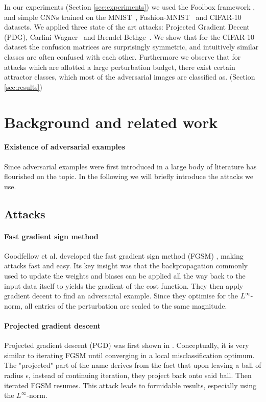\documentclass{article}
\begin{document}
In our experiments (Section \ref{sec:experiments}) we used the Foolbox framework \cite{rauber2017foolbox}, and simple CNNs trained on the MNIST~\cite{deng2012mnist}, Fashion-MNIST~\cite{deng2012mnist} and CIFAR-10~\cite{krizhevsky2009learning} datasets. We applied three state of the art attacks: Projected Gradient Decent (PDG)\cite{madry2017towards}, Carlini-Wagner~\cite{carlini2017towards} and Brendel-Bethge~\cite{brendel2019accurate}.
We show that for the CIFAR-10 dataset the confusion matrices are surprisingly symmetric, and intuitively similar classes are often confused with each other. Furthermore we observe that for attacks which are allotted a large perturbation budget, there exist certain attractor classes, which most of the adversarial images are classified as. (Section \ref{sec:results})

\section{Background and related work}

\paragraph{Existence of adversarial examples}
Since adversarial examples were first introduced in \cite{Szegedy13} a large body of literature has flourished on the topic. In the following we will briefly introduce the attacks we use.

\subsection{Attacks}\label{sec:Attacks}

\paragraph{Fast gradient sign method}
Goodfellow et al. developed the fast gradient sign method (FGSM) \cite{goodfellow2014explaining}, making attacks fast and easy. Its key insight was that the backpropagation commonly used to update the weights and biases can be applied all the way back to the input data itself to yields the gradient of the cost function. They then apply gradient decent to find an adversarial example. Since they optimise for the $L^\infty$-norm, all entries of the perturbation are scaled to the same magnitude.

\paragraph{Projected gradient descent}
Projected gradient descent (PGD) was first shown in \cite{madry2017towards}. Conceptually, it is very similar to iterating FGSM until converging in a local misclassification optimum. The "projected" part of the name derives from the fact that upon leaving a ball of radius $\epsilon$, instead of continuing iteration, they project back onto said ball. Then iterated FGSM resumes.
This attack leads to formidable results, especially using the $L^\infty$-norm.
\end{document}
